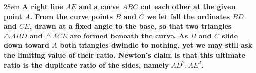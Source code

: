 \documentclass[border=4pt]{standalone}
\begin{document}
\begin{varwidth}{28em}
\large\bfseries
A right line $AE$ and a curve $ABC$ cut each other at the      given point $A$. From the curve points $B$ and $C$ we let fall the ordinates      $BD$ and $CE$, drawn at a fixed angle to the base, so that two triangles $\triangle ABD$      and $\triangle ACE$ are formed beneath the curve. As $B$ and $C$ slide down toward $A$      both triangles dwindle to nothing, yet we may still ask the limiting value of their ratio.      Newton's claim is that this ultimate ratio is the duplicate ratio of the sides,      namely $AD^2 : AE^2$.
\end{varwidth}
\end{document}
